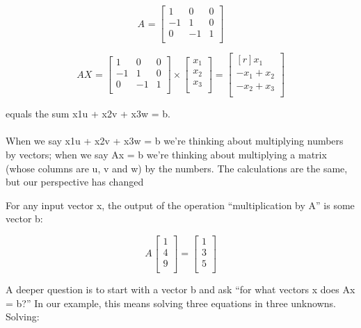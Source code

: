 \documentclass{article}
\begin{document}
\[
  A_{} = 
  \begin{bmatrix}
    1 & 0 & 0\\
    -1& 1 & 0\\
    0 & -1 & 1\\
  \end{bmatrix}
\]

\[
  AX_{} = 
  \begin{bmatrix}
    1 & 0 & 0\\
    -1& 1 & 0\\
    0 & -1 & 1\\
  \end{bmatrix}
  \times
  \begin{bmatrix}
   x_1\\
    x_2\\
    x_3\\ 
  \end{bmatrix}
  =
   \begin{bmatrix*}[r]
    x_1\\
    -x_1 + x_2\\
    -x_2 + x_3\\ 
  \end{bmatrix*}
 
\]

equals the sum x1u + x2v + x3w = b. \\\\
When we say x1u + x2v + x3w = b we’re thinking about multiplying numbers by vectors; when we say Ax = b we’re thinking about multiplying a
matrix (whose columns are u, v and w) by the numbers. The calculations are
the same, but our perspective has changed

\pagebreak
For any input vector x, the output of the operation “multiplication by A” is
some vector b:

\[
  A_{} 
  \begin{bmatrix}
    1\\
    4\\
    9\\
  \end{bmatrix}
  =
  \begin{bmatrix}
    1\\
    3\\
    5\\
  \end{bmatrix}
\]


A deeper question is to start with a vector b and ask “for what vectors x does
Ax = b?” In our example, this means solving three equations in three unknowns. Solving: 
\end{document}
